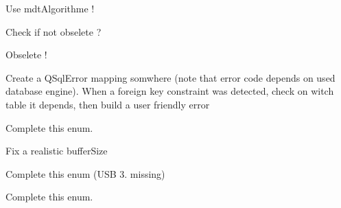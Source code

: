 \begin{DoxyRefList}
\item[\label{todo__todo000081}%
\hypertarget{todo__todo000081}{}%
Member \hyperlink{classmdt_tt_test_a5920961d0f32d37033a184ed76b2cf3d}{mdt\-Tt\-Test\-:\-:is\-In\-Range} (double x, double min, double max=std\-::numeric\-\_\-limits$<$ double $>$\-::max())]Use mdt\-Algorithme !  
\item[\label{todo__todo000085}%
\hypertarget{todo__todo000085}{}%
Class \hyperlink{classmdt_tt_test_data}{mdt\-Tt\-Test\-Data} ]Check if not obselete ?  
\item[\label{todo__todo000086}%
\hypertarget{todo__todo000086}{}%
Member \hyperlink{classmdt_tt_test_item_node_setup_data_a2c58ca8c543b503e7d96d3f13112078f}{mdt\-Tt\-Test\-Item\-Node\-Setup\-Data\-:\-:add\-Node\-Setup\-Data} (const \hyperlink{classmdt_tt_test_node_setup_data}{mdt\-Tt\-Test\-Node\-Setup\-Data} \&data)]Obselete !  
\item[\label{todo__todo000091}%
\hypertarget{todo__todo000091}{}%
Member \hyperlink{classmdt_tt_test_node_unit_a9da3578291033f5f9d77f186fe2fb325}{mdt\-Tt\-Test\-Node\-Unit\-:\-:get\-Test\-Links\-Depending\-On\-Connection} (const Q\-Variant \&test\-Node\-Unit\-Connection\-Id, bool \&ok)]Create a Q\-Sql\-Error mapping somwhere (note that error code depends on used database engine). When a foreign key constraint was detected, check on witch table it depends, then build a user friendly error  
\item[\label{todo__todo000039}%
\hypertarget{todo__todo000039}{}%
Member \hyperlink{classmdt_usb_control_transfer_a80b0f5ac6d8ae7b7e7471b012c34937d}{mdt\-Usb\-Control\-Transfer\-:\-:Descriptor\-Type\-\_\-t} ]Complete this enum.  
\item[\label{todo__todo000041}%
\hypertarget{todo__todo000041}{}%
Member \hyperlink{classmdt_usb_control_transfer_a66bfbc135c55bf10377d68cf23d91d0d}{mdt\-Usb\-Control\-Transfer\-:\-:mdt\-Usb\-Control\-Transfer} (libusb\-\_\-device\-\_\-handle $\ast$dev\-\_\-handle, int buffer\-Size=1024)]Fix a realistic buffer\-Size 
\item[\label{todo__todo000040}%
\hypertarget{todo__todo000040}{}%
Member \hyperlink{classmdt_usb_control_transfer_acae7a9c10825dd7fa7695a16986a2f36}{mdt\-Usb\-Control\-Transfer\-:\-:Standard\-Feature\-Selector\-\_\-t} ]Complete this enum (U\-S\-B 3. missing)  
\item[\label{todo__todo000038}%
\hypertarget{todo__todo000038}{}%
Member \hyperlink{classmdt_usb_control_transfer_a9a13f68d5d4998dd8564c4e4c6278c77}{mdt\-Usb\-Control\-Transfer\-:\-:Standard\-Request\-Code\-\_\-t} ]Complete this enum.  

\end{DoxyRefList}
